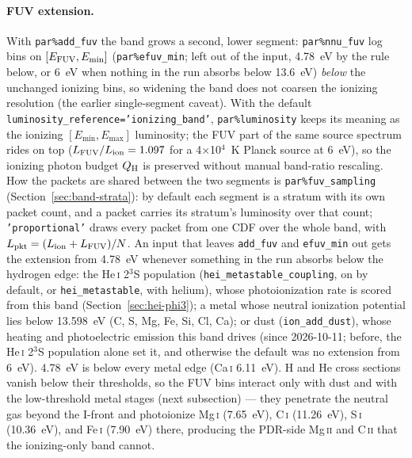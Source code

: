 \documentclass[english,a4paper]{my_memo}
\newcommand{\code}[1]{\texttt{#1}}
\begin{document}
\paragraph{FUV extension.}  With \code{par\%add\_fuv} the band grows a
second, lower segment: \code{par\%nnu\_fuv} log bins on
$[E_{\rm FUV}, E_{\min}]$ (\code{par\%efuv\_min}; left out of the input, 4.78~eV by the rule below, or 6~eV when nothing in the run absorbs below 13.6~eV)
\emph{below} the unchanged ionizing bins, so widening the band does not
coarsen the ionizing resolution (the earlier single-segment caveat).
With the default \code{luminosity\_reference='ionizing\_band'},
\code{par\%luminosity} keeps its meaning as the ionizing
$[E_{\min}, E_{\max}]$ luminosity; the FUV part of the same source
spectrum rides on top ($L_{\rm FUV}/L_{\rm ion} = 1.097$ for a
4$\times$10$^4$~K Planck source at 6~eV), so the ionizing photon budget
$Q_{\rm H}$ is preserved without manual band-ratio rescaling.  How the
packets are shared between the two segments is \code{par\%fuv\_sampling}
(Section~\ref{sec:band-strata}): by default each segment is a stratum with
its own packet count, and a packet carries its stratum's luminosity over
that count; \code{'proportional'} draws every packet from one CDF over the
whole band, with $L_{\rm pkt} = (L_{\rm ion} + L_{\rm FUV})/N$.  An input
that leaves \code{add\_fuv} and \code{efuv\_min} out gets the extension
from 4.78~eV whenever something in the run absorbs below the hydrogen
edge: the He\,\textsc{i} 2$^3$S population (\code{hei\_metastable\_coupling},
on by default, or \code{hei\_metastable}, with helium), whose
photoionization rate is scored from this band
(Section~\ref{sec:hei-phi3}); a metal whose neutral ionization potential
lies below 13.598~eV (C, S, Mg, Fe, Si, Cl, Ca); or dust
(\code{ion\_add\_dust}), whose heating and photoelectric emission this band
drives (since 2026-10-11; before, the He\,\textsc{i} 2$^3$S population
alone set it, and otherwise the default was no extension from 6~eV).
4.78~eV is below every metal edge (Ca\,\textsc{i} 6.11~eV).  H and He cross
sections vanish below their thresholds, so the FUV bins interact only
with dust and with the low-threshold metal stages (next subsection) ---
they penetrate the neutral gas beyond the I-front and photoionize
Mg\,\textsc{i} (7.65~eV), C\,\textsc{i} (11.26~eV), S\,\textsc{i}
(10.36~eV), and Fe\,\textsc{i} (7.90~eV) there, producing the
PDR-side Mg\,\textsc{ii} and C\,\textsc{ii} that the
ionizing-only band cannot.
\end{document}
